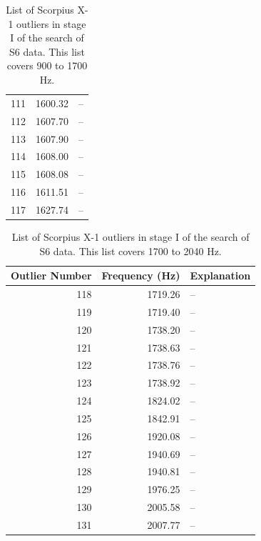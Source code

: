 \begin{table}
\begin{center}
\begin{tabular}{r r l}
111 & 1600.32 & -- \\
112 & 1607.70 & -- \\
113 & 1607.90 & -- \\
114 & 1608.00 & -- \\
115 & 1608.08 & -- \\
116 & 1611.51 & -- \\
117 & 1627.74 & -- \\
\end{tabular}
\caption{List of Scorpius X-1 outliers in stage I of the search of S6 data. This list covers 900 to 1700 Hz.}
\label{ScoX1S6outlierTableHF2}
\end{center}
\end{table}

\begin{table}
\begin{center}
\begin{tabular}{r r l}
Outlier Number & Frequency (Hz) & Explanation \\
\hline
118 & 1719.26 & -- \\
119 & 1719.40 & -- \\
120 & 1738.20 & -- \\
121 & 1738.63 & -- \\
122 & 1738.76 & -- \\
123 & 1738.92 & -- \\
124 & 1824.02 & -- \\
125 & 1842.91 & -- \\
126 & 1920.08 & -- \\
127 & 1940.69 & -- \\
128 & 1940.81 & -- \\
129 & 1976.25 & -- \\
130 & 2005.58 & -- \\
131 & 2007.77 & -- \\
\end{tabular}
\caption{List of Scorpius X-1 outliers in stage I of the search of S6 data. This list covers 1700 to 2040 Hz.}
\label{ScoX1S6outlierTableHF3}
\end{center}
\end{table}



